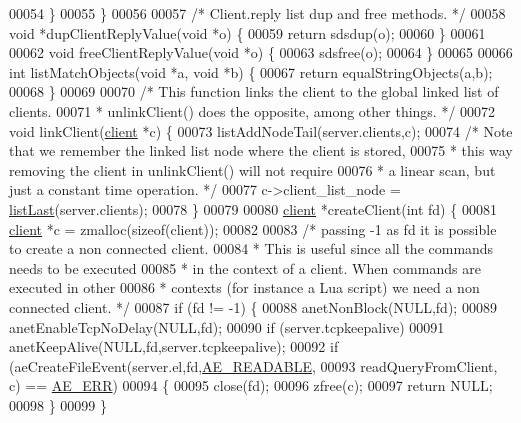 \begin{DoxyCode}
00054     \}
00055 \}
00056 
00057 \textcolor{comment}{/* Client.reply list dup and free methods. */}
00058 \textcolor{keywordtype}{void} *dupClientReplyValue(\textcolor{keywordtype}{void} *o) \{
00059     \textcolor{keywordflow}{return} sdsdup(o);
00060 \}
00061 
00062 \textcolor{keywordtype}{void} freeClientReplyValue(\textcolor{keywordtype}{void} *o) \{
00063     sdsfree(o);
00064 \}
00065 
00066 \textcolor{keywordtype}{int} listMatchObjects(\textcolor{keywordtype}{void} *a, \textcolor{keywordtype}{void} *b) \{
00067     \textcolor{keywordflow}{return} equalStringObjects(a,b);
00068 \}
00069 
00070 \textcolor{comment}{/* This function links the client to the global linked list of clients.}
00071 \textcolor{comment}{ * unlinkClient() does the opposite, among other things. */}
00072 \textcolor{keywordtype}{void} linkClient(\hyperlink{structclient}{client} *c) \{
00073     listAddNodeTail(server.clients,c);
00074     \textcolor{comment}{/* Note that we remember the linked list node where the client is stored,}
00075 \textcolor{comment}{     * this way removing the client in unlinkClient() will not require}
00076 \textcolor{comment}{     * a linear scan, but just a constant time operation. */}
00077     c->client\_list\_node = \hyperlink{adlist_8h_a5e0fad60032ef0fe9adcf9811e2f2fba}{listLast}(server.clients);
00078 \}
00079 
00080 \hyperlink{structclient}{client} *createClient(\textcolor{keywordtype}{int} fd) \{
00081     \hyperlink{structclient}{client} *c = zmalloc(\textcolor{keyword}{sizeof}(client));
00082 
00083     \textcolor{comment}{/* passing -1 as fd it is possible to create a non connected client.}
00084 \textcolor{comment}{     * This is useful since all the commands needs to be executed}
00085 \textcolor{comment}{     * in the context of a client. When commands are executed in other}
00086 \textcolor{comment}{     * contexts (for instance a Lua script) we need a non connected client. */}
00087     \textcolor{keywordflow}{if} (fd != -1) \{
00088         anetNonBlock(NULL,fd);
00089         anetEnableTcpNoDelay(NULL,fd);
00090         \textcolor{keywordflow}{if} (server.tcpkeepalive)
00091             anetKeepAlive(NULL,fd,server.tcpkeepalive);
00092         \textcolor{keywordflow}{if} (aeCreateFileEvent(server.el,fd,\hyperlink{ae_8h_a7a9a2162d007d09739955b4e55c65bf3}{AE\_READABLE},
00093             readQueryFromClient, c) == \hyperlink{ae_8h_aa16dcf7effdf8f8df97f51b1cb51a9df}{AE\_ERR})
00094         \{
00095             close(fd);
00096             zfree(c);
00097             \textcolor{keywordflow}{return} NULL;
00098         \}
00099     \}

\end{DoxyCode}
